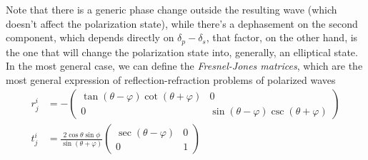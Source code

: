 \documentclass[../electromagnetism.tex]{subfiles}
\begin{document}
Note that there is a generic phase change outside the resulting wave (which doesn't affect the polarization state), while there's a dephasement on the second component, which depends directly on $\delta_p-\delta_s$, that factor, on the other hand, is the one that will change the polarization state into, generally, an elliptical state.\\
In the most general case, we can define the \textit{Fresnel-Jones matrices}, which are the most general expression of reflection-refraction problems of polarized waves
\begin{equation}
	\begin{aligned}
		r^i_j&= -\begin{pmatrix}
		\tan\left( \theta-\varphi \right)\cot\left( \theta+\varphi \right)&0\\
		0&\sin\left( \theta-\varphi \right)\csc\left( \theta+\varphi \right)
		\end{pmatrix}\\
		t^i_j&= \frac{2\cos\theta\sin\phi}{\sin\left( \theta+\varphi \right)}\begin{pmatrix}
		\sec\left( \theta-\varphi \right)&0\\
			0&1
		\end{pmatrix}
	\end{aligned}
	\label{eq:fresneljones.rjon}
\end{equation}
\end{document}
